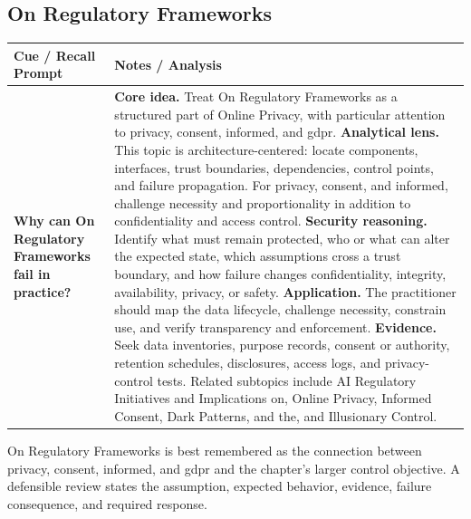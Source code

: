\documentclass[11pt]{article}
\newcommand{\CornellHeader}{%
\rowcolor{Navy}\color{white}\bfseries Cue / Recall Prompt & \color{white}\bfseries Notes / Analysis\\\hline}
\newcommand{\CornellRow}[2]{%
\cellcolor{CueGray}\RaggedRight\textbf{#1} & \RaggedRight #2\\\hline}
\begin{document}
\subsection*{On Regulatory Frameworks}
\begin{longtable}{>{\RaggedRight\arraybackslash}p{}|>{\RaggedRight\arraybackslash}p{}}
\CornellHeader
\CornellRow{Why can On Regulatory Frameworks fail in practice?}{\textbf{Core idea.} Treat On Regulatory Frameworks as a structured part of Online Privacy, with particular attention to privacy, consent, informed, and gdpr. \textbf{Analytical lens.} This topic is architecture-centered: locate components, interfaces, trust boundaries, dependencies, control points, and failure propagation. For privacy, consent, and informed, challenge necessity and proportionality in addition to confidentiality and access control. \textbf{Security reasoning.} Identify what must remain protected, who or what can alter the expected state, which assumptions cross a trust boundary, and how failure changes confidentiality, integrity, availability, privacy, or safety. \textbf{Application.} The practitioner should map the data lifecycle, challenge necessity, constrain use, and verify transparency and enforcement. \textbf{Evidence.} Seek data inventories, purpose records, consent or authority, retention schedules, disclosures, access logs, and privacy-control tests. Related subtopics include AI Regulatory Initiatives and Implications on, Online Privacy, Informed Consent, Dark Patterns, and the, and Illusionary Control.}
\end{longtable}
\begin{topicsummary}
On Regulatory Frameworks is best remembered as the connection between privacy, consent, informed, and gdpr and the chapter's larger control objective. A defensible review states the assumption, expected behavior, evidence, failure consequence, and required response.
\end{topicsummary}
\end{document}
